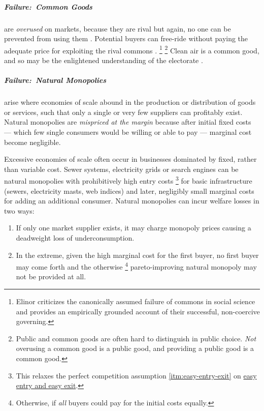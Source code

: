 \subparagraph{Failure:\ Common Goods}
\label{sec:common-good}
are \emph{overused} on markets, because they are rival but again, no one can be prevented from using them \citep{Hardin-1968-aa}.
Potential buyers can free-ride without paying the adequate price for exploiting the rival commons \citep{Hardin-1968-aa}.
\footnote{
	Elinor \cite{Ostrom1990} criticizes the canonically assumed failure of commons in social science and provides an empirically grounded account of their successful, non-coercive governing.
}
\footnote{
	Public and common goods are often hard to distinguish in public choice.
	\emph{Not} overusing a common good is a public good, and providing a public good is a common good.
}
Clean air is a common good, and so may be the enlightened understanding of the electorate \citep{Caplan2007}.

\subparagraph{Failure:\ Natural Monopolies}
	\label{sec:natural-monopoly}
arise where economies of scale abound in the production or distribution of goods or services, such that only a single or very few suppliers can profitably exist.
Natural monopolies are \emph{mispriced at the margin} because after initial fixed costs --- which few single consumers would be willing or able to pay --- marginal cost become negligible.

Excessive economies of scale often occur in businesses dominated by fixed, rather than variable cost.
Sewer systems, electricity grids or search engines can be natural monopolies with prohibitively high entry costs
\footnote{
	This relaxes the perfect competition assumption \ref{itm:easy-entry-exit} on \hyperref[itm:easy-entry-exit]{easy entry and easy exit}.
}
for basic infrastructure (sewers, electricity masts, web indices) and later, negligibly small marginal costs for adding an additional consumer.
Natural monopolies can incur welfare losses in two ways:

\begin{enumerate}
	\item If only one market supplier exists, it may charge monopoly prices causing a deadweight loss of underconsumption.

	\item In the extreme, given the high marginal cost for the first buyer, no first buyer may come forth and the otherwise
	\footnote{
		Otherwise, if \emph{all} buyers could pay for the initial costs equally.
	}
	pareto-improving natural monopoly may not be provided at all.
\end{enumerate}

